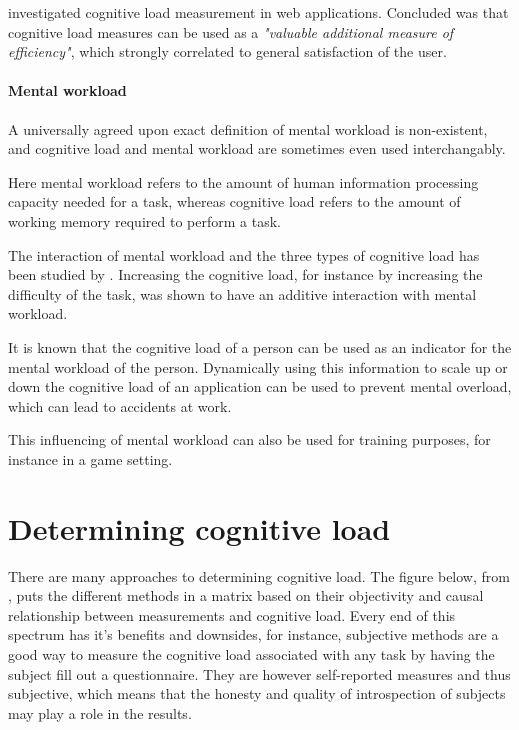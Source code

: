 \documentclass[11pt,leqno,a4paper]{report} %
\begin{document}
\citet{Schmutz2009} investigated cognitive load measurement in web applications. Concluded was that cognitive load measures can be used as a \textit{"valuable additional measure of efficiency"}, which strongly correlated to general satisfaction of the user. 

\paragraph{Mental workload}

A universally agreed upon exact definition of mental workload is non-existent, and cognitive load and mental workload are sometimes even used interchangably. 

Here mental workload refers to the amount of human information processing capacity needed for a task, whereas cognitive load refers to the amount of working memory required to perform a task.

The interaction of mental workload and the three types of cognitive load has been studied by \citet{Galy2012269}. Increasing the cognitive load, for instance by increasing the difficulty of the task, was shown to have an additive interaction with mental workload.

It is known that the cognitive load of a person can be used as an indicator for the mental workload of the person. Dynamically using this information to scale up or down the cognitive load of an application can be used to prevent mental overload, which can lead to accidents at work. 
 
This influencing of mental workload can also be used for training purposes, for instance in a game setting. 


\section{Determining cognitive load}

There are many approaches to determining cognitive load. The figure below, from \citet{brunken2003direct}, puts the different methods in a matrix based on their objectivity and causal relationship between measurements and cognitive load. Every end of this spectrum has it's benefits and downsides, for instance, subjective methods are a good way to measure the cognitive load associated with any task by having the subject fill out a questionnaire. They are however self-reported measures and thus subjective, which means that the honesty and quality of introspection of subjects may play a role in the results. 
\end{document}
